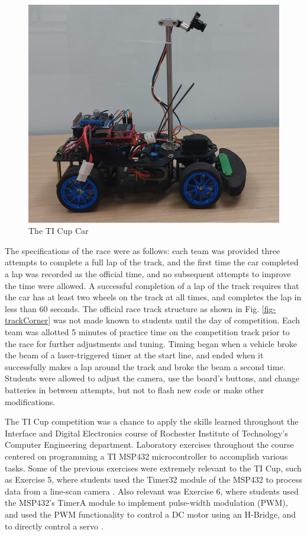 \documentclass{article}
\begin{document}
\begin{figure}[htbp]
    \centering
    \includegraphics[width=\linewidth]{figs/CarRightSideProfile.jpg}
    \caption{The TI Cup Car \cite{CarPhoto}}
    \label{fig-sideProfileCar}
\end{figure}

The specifications of the race were as follows: each team was provided three attempts to complete a full lap of the track, and the first time the car completed a lap was recorded as the official time, and no subsequent attempts to improve the time were allowed. A successful completion of a lap of the track requires that the car has at least two wheels on the track at all times, and completes the lap in less than 60 seconds. The official race track structure as shown in Fig. \ref{fig-trackCorner} was not made known to students until the day of competition. Each  team was allotted 5 minutes of practice time on the competition track prior to the race for further adjustments and tuning.  Timing began when a vehicle broke the beam of a laser-triggered timer at the start line, and ended when it successfully makes a lap around the track and broke the beam a second time. Students were allowed to adjust the camera, use the board's buttons, and change batteries in between attempts, but not to flash new code or make other modifications. 

The TI Cup competition was a chance to apply the skills learned throughout the Interface and Digital Electronics course of Rochester Institute of Technology's Computer Engineering department. Laboratory exercises throughout the course centered on programming a TI MSP432 microcontroller to accomplish various tasks. Some of the previous exercises were extremely relevant to the TI Cup, such as Exercise 5, where students used the Timer32 module of the MSP432 to process data from a line-scan camera \cite{ourLab5}. Also relevant was Exercise 6, where students used the MSP432's TimerA module to implement pulse-width modulation (PWM), and used the PWM functionality to control a DC motor using an H-Bridge, and to directly control a servo \cite{ourLab6}.
\end{document}
